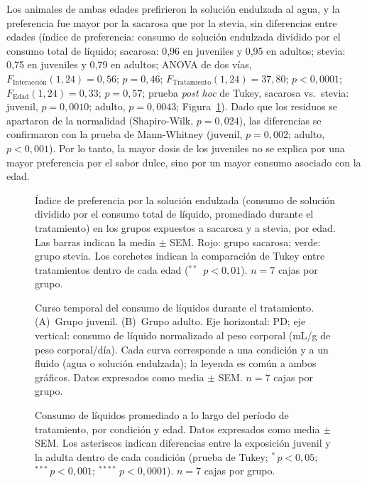 Los animales de ambas edades prefirieron la solución endulzada al agua, y la preferencia fue mayor por la sacarosa que por la stevia, sin diferencias entre edades (índice de preferencia: consumo de solución endulzada dividido por el consumo total de líquido; sacarosa: 0,96 en juveniles y 0,95 en adultos; stevia: 0,75 en juveniles y 0,79 en adultos; ANOVA de dos vías, $F_{\text{Interacción}}(1, 24) = 0{,}56$; $p = 0{,}46$; $F_{\text{Tratamiento}}(1, 24) = 37{,}80$; $p < 0{,}0001$; $F_{\text{Edad}}(1, 24) = 0{,}33$; $p = 0{,}57$; prueba \textit{post hoc} de Tukey, sacarosa vs.\ stevia: juvenil, $p = 0{,}0010$; adulto, $p = 0{,}0043$; Figura~\ref{fig:preferencia}). Dado que los residuos se apartaron de la normalidad (Shapiro-Wilk, $p = 0{,}024$), las diferencias se confirmaron con la prueba de Mann-Whitney (juvenil, $p = 0{,}002$; adulto, $p < 0{,}001$). Por lo tanto, la mayor dosis de los juveniles no se explica por una mayor preferencia por el sabor dulce, sino por un mayor consumo asociado con la edad.

\begin{figure}[htbp]
  \centering
  \caption[Índice de preferencia por la solución endulzada]{Índice de preferencia por la solución endulzada (consumo de solución dividido por el consumo total de líquido, promediado durante el tratamiento) en los grupos expuestos a sacarosa y a stevia, por edad. Las barras indican la media $\pm$ SEM. Rojo: grupo sacarosa; verde: grupo stevia. Los corchetes indican la comparación de Tukey entre tratamientos dentro de cada edad ($^{**}$~$p < 0{,}01$). $n = 7$ cajas por grupo.}
  \label{fig:preferencia}
\end{figure}

\begin{figure}[htbp]
  \centering
  \caption[Curso temporal del consumo de líquidos durante el tratamiento]{Curso temporal del consumo de líquidos durante el tratamiento. (A)~Grupo juvenil. (B)~Grupo adulto. Eje horizontal: PD; eje vertical: consumo de líquido normalizado al peso corporal (mL/g de peso corporal/día). Cada curva corresponde a una condición y a un fluido (agua o solución endulzada); la leyenda es común a ambos gráficos. Datos expresados como media $\pm$ SEM. $n = 7$ cajas por grupo.}
  \label{fig:consumo-liquidos}
\end{figure}

\begin{figure}[htbp]
  \centering
  \caption[Consumo de líquidos promediado durante el tratamiento]{Consumo de líquidos promediado a lo largo del período de tratamiento, por condición y edad. Datos expresados como media $\pm$ SEM. Los asteriscos indican diferencias entre la exposición juvenil y la adulta dentro de cada condición (prueba de Tukey; $^{*}\,p < 0{,}05$; $^{***}\,p < 0{,}001$; $^{****}\,p < 0{,}0001$). $n = 7$ cajas por grupo.}
  \label{fig:consumo-liquidos-promedio}
\end{figure}

